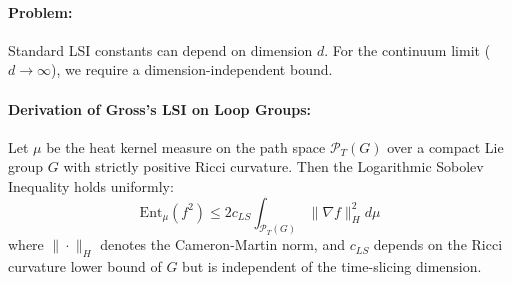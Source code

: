 \paragraph{Problem:} Standard LSI constants can depend on dimension $d$. For the continuum limit ($d \to \infty$), we require a dimension-independent bound.
\paragraph{Derivation of Gross's LSI on Loop Groups:}
\begin{theorem}[Gross, 1993]
    Let $\mu$ be the heat kernel measure on the path space $\mathcal{P}_T(G)$ over a compact Lie group $G$ with strictly positive Ricci curvature. Then the Logarithmic Sobolev Inequality holds uniformly:
    \begin{equation}
        \text{Ent}_\mu(f^2) \le 2 c_{LS} \int_{\mathcal{P}_T(G)} \|\nabla f\|^2_{H} d\mu
    \end{equation}
    where $\|\cdot\|_H$ denotes the Cameron-Martin norm, and $c_{LS}$ depends on the Ricci curvature lower bound of $G$ but is independent of the time-slicing dimension.
\end{theorem}
